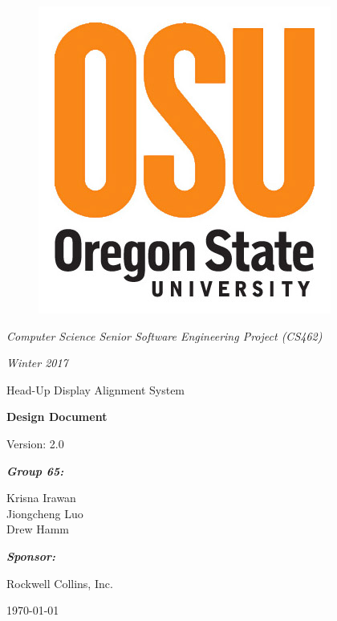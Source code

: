 \documentclass[letterpaper,10pt,onecolumn]{IEEEtran}
\def\title{Computer Science Senior Software Engineering Project (CS462)}
\def\name{Krisna Irawan\\ Jiongcheng Luo\\ Drew Hamm}
\def\doc{Design Document}
\def\version{2.0}
\def\term{Winter 2017}
\def\project{Head-Up Display Alignment System}
\begin{document}
\begin{titlepage}
\centering
	\begin{figure}
	      	\includegraphics[scale=0.25]{osu_logo}
	\end{figure}
	{\Large\itshape \title\par}
	{\Large\itshape \term\par}
	\vspace{1cm}
	\scshape{
		{\Huge \project\par}
		\vspace{1cm}
		{\Huge\bfseries\doc\par}
		{\large Version: \version\par}
	}
	\vspace{1cm}
	{\large\itshape\bfseries Group 65:\par}
	{\large \name\par}
	\vspace{1cm}
	{\large\itshape\bfseries Sponsor:\par}
	{\large Rockwell Collins, Inc.\par}
	\vspace{2cm}
	{\large \today\par}
	\vspace{4cm}

	\begin{abstract}
		A Head-up Display (HUD) Alignment system is developed as a proof of concept aims to explore a potential technological innovation for the HUD system that presents critical flight information to pilots. The primary objective of this project is to reduce the cost and time required to precisely align flight information to the HUD by introducing an additional sensor component to the system to make the alignment process more dynamic. This document is intended for use by Rockwell Collins and their HUD system development team. This document provides and explains an overall system framework, design viewpoints and specific design description for each viewpoint within the system.
	\end{abstract}
	\vfill

\end{titlepage}
\tableofcontents
\end{document}
